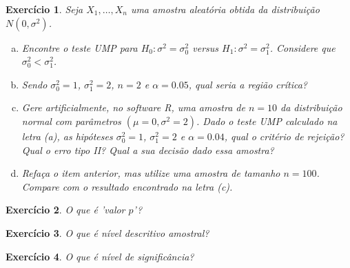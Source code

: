 \documentclass[letter,11pt]{article}
\newtheorem{exer}{Exercício}
\begin{document}
\begin{exer} \rm Seja $X_1, \ldots, X_n$ uma amostra aleatória obtida da distribuição $N(0, \sigma^2)$.
\begin{enumerate}[a)]
\item Encontre o teste UMP para $H_0:\sigma^2=\sigma_0^2$ versus $H_1:\sigma^2=\sigma_1^2$. Considere que $\sigma_0^2< \sigma_1^2$.

\item Sendo $\sigma_0^2=1$, $\sigma^2_1=2$, $n=2$ e $\alpha=0.05$, qual seria a região crítica? 


\item Gere artificialmente, no software R, uma amostra de $n= 10$ da distribuição normal com parâmetros $(\mu=0, \sigma^2=2)$.  Dado o teste UMP calculado na letra (a), as hipóteses $\sigma_0^2=1$, $\sigma^2_1=2$ e $\alpha=0.04$, qual o critério de rejeição? Qual o erro tipo II? Qual a sua decisão dado essa amostra?

\item Refaça o item anterior, mas utilize uma amostra de tamanho $n=100$.  Compare com o resultado encontrado na letra (c).

\end{enumerate}
\end{exer}


\begin{exer} \rm O que é 'valor $p$'?
\end{exer}


\begin{exer} \rm O que é nível descritivo amostral? 
\end{exer}


\begin{exer} \rm O que é nível de significância?
\end{exer}
\end{document}
